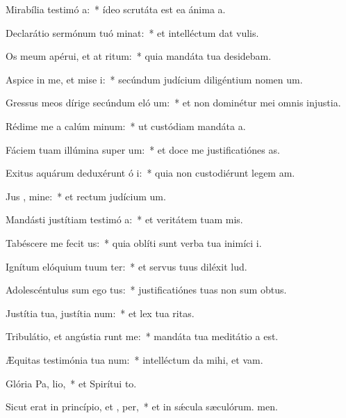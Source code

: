 \item Mirabília testimó a:~* ídeo scrutáta est ea ánima a.
\item Declarátio sermónum tuó minat:~* et intelléctum dat vulis.
\item Os meum apérui, et at ritum:~* quia mandáta tua desidebam.
\item Aspice in me, et mise i:~* secúndum judícium diligéntium nomen um.
\item Gressus meos dírige secúndum eló um:~* et non dominétur mei omnis injustia.
\item Rédime me a calúm minum:~* ut custódiam mandáta a.
\item Fáciem tuam illúmina super  um:~* et doce me justificatiónes as.
\item Exitus aquárum deduxérunt ó i:~* quia non custodiérunt legem am.
\item Jus , mine:~* et rectum judícium um.
\item Mandásti justítiam testimó a:~* et veritátem tuam mis.
\item Tabéscere me fecit  us:~* quia oblíti sunt verba tua inimíci i.
\item Ignítum elóquium tuum ter:~* et servus tuus diléxit lud.
\item Adolescéntulus sum ego  tus:~* justificatiónes tuas non sum obtus.
\item Justítia tua, justítia  num:~* et lex tua ritas.
\item Tribulátio, et angústia runt me:~* mandáta tua meditátio a est.
\item Æquitas testimónia tua  num:~* intelléctum da mihi, et vam.
\item Glória Pa,  lio,~* et Spirítui to.
\item Sicut erat in princípio, et ,  per,~* et in sǽcula sæculórum. men.
